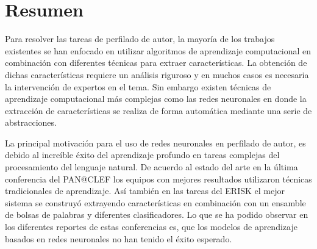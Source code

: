 \chapter{Resumen}






Para resolver las tareas de perfilado de autor, la mayoría de los trabajos existentes se han enfocado en utilizar algoritmos de aprendizaje computacional en combinación con diferentes técnicas para extraer características. La obtención de dichas características requiere un análisis riguroso y en muchos casos es necesaria la intervención de expertos en el tema. Sin embargo existen técnicas de aprendizaje computacional más complejas como las redes neuronales en donde la extracción de características se realiza de forma automática mediante una serie de abstracciones.

La principal motivación para el uso de redes neuronales en perfilado de autor, es debido al increíble éxito del aprendizaje profundo en tareas complejas del procesamiento del  lenguaje natural. De acuerdo al estado del arte en la última conferencia del PAN@CLEF los equipos con mejores resultados utilizaron técnicas tradicionales de aprendizaje. Así también en las tareas del ERISK el mejor sistema se construyó extrayendo características en combinación con un ensamble de bolsas de palabras y diferentes clasificadores. Lo que se ha podido observar en los diferentes reportes de estas conferencias es, que los modelos de aprendizaje basados en redes neuronales no han tenido el éxito esperado. 

